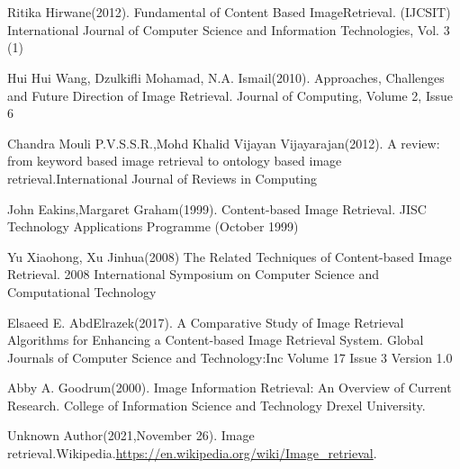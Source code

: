 \documentclass{llncs}
\begin{document}





\newpage

\chapter*{}
\begin{thebibliography}{}
    Ritika Hirwane(2012).
    Fundamental of Content Based ImageRetrieval.
    (IJCSIT) International Journal of Computer Science and Information Technologies, Vol. 3 (1)
    
    Hui Hui Wang, Dzulkifli Mohamad, N.A. Ismail(2010).
    Approaches, Challenges and Future Direction
    of Image Retrieval.
    Journal of Computing, Volume 2, Issue 6
    
    Chandra Mouli P.V.S.S.R.,Mohd Khalid
    Vijayan Vijayarajan(2012).
    A review: from keyword based image retrieval to ontology 
    based image retrieval.International Journal of Reviews in Computing  
    
    John Eakins,Margaret Graham(1999).
    Content-based Image Retrieval.
    JISC Technology Applications Programme (October 1999)

    
    Yu Xiaohong, Xu Jinhua(2008)
    The Related Techniques of Content-based Image Retrieval.
    2008 International Symposium on Computer Science and Computational Technology
    
    Elsaeed E. AbdElrazek(2017).
    A Comparative Study of Image Retrieval Algorithms for
    Enhancing a Content-based Image Retrieval System.
    Global Journals  of Computer Science and Technology:Inc Volume 17 Issue 3 Version 1.0

    Abby A. Goodrum(2000).
    Image Information Retrieval: An Overview of Current Research.
    College of Information Science and Technology Drexel University.

    Unknown Author(2021,November 26).
    Image retrieval.Wikipedia.\url{https://en.wikipedia.org/wiki/Image_retrieval}.
    
\end{thebibliography}
\end{document}
